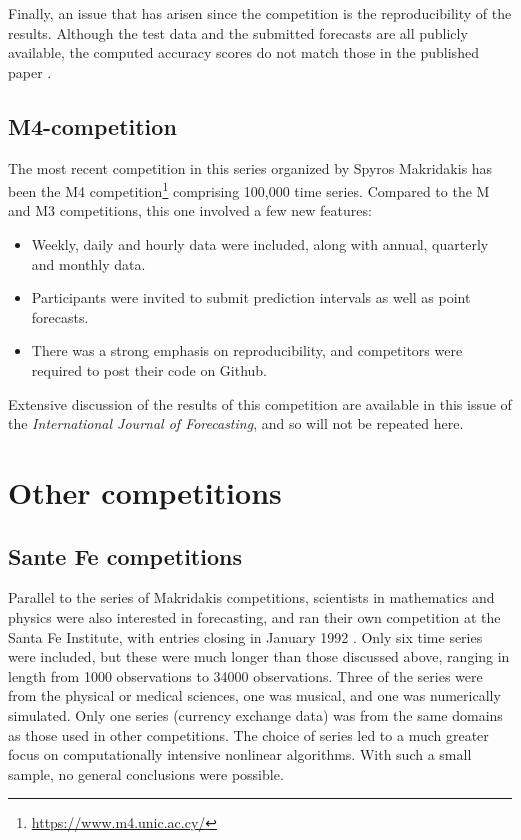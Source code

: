 \documentclass[11pt,a4paper,]{article}
\providecommand{\tightlist}{%
  \setlength{\itemsep}{0pt}\setlength{\parskip}{0pt}}
\begin{document}
Finally, an issue that has arisen since the competition is the reproducibility of the results. Although the test data and the submitted forecasts are all publicly available, the computed accuracy scores do not match those in the published paper \autocite{Hyndsightevidence}.

\hypertarget{m4-competition}{%
\subsection*{M4-competition}\label{m4-competition}}

The most recent competition in this series organized by Spyros Makridakis has been the M4 competition\footnote{\url{https://www.m4.unic.ac.cy/}} comprising 100,000 time series. Compared to the M and M3 competitions, this one involved a few new features:

\begin{itemize}
\tightlist
\item
  Weekly, daily and hourly data were included, along with annual, quarterly and monthly data.
\item
  Participants were invited to submit prediction intervals as well as point forecasts.
\item
  There was a strong emphasis on reproducibility, and competitors were required to post their code on Github.
\end{itemize}

Extensive discussion of the results of this competition are available in this issue of the \emph{International Journal of Forecasting}, and so will not be repeated here.

\hypertarget{sec:other}{%
\section{Other competitions}\label{sec:other}}

\hypertarget{sante-fe-competitions}{%
\subsection*{Sante Fe competitions}\label{sante-fe-competitions}}

Parallel to the series of Makridakis competitions, scientists in mathematics and physics were also interested in forecasting, and ran their own competition at the Santa Fe Institute, with entries closing in January 1992 \autocite{GW1993}. Only six time series were included, but these were much longer than those discussed above, ranging in length from 1000 observations to 34000 observations. Three of the series were from the physical or medical sciences, one was musical, and one was numerically simulated. Only one series (currency exchange data) was from the same domains as those used in other competitions. The choice of series led to a much greater focus on computationally intensive nonlinear algorithms. With such a small sample, no general conclusions were possible.
\end{document}
